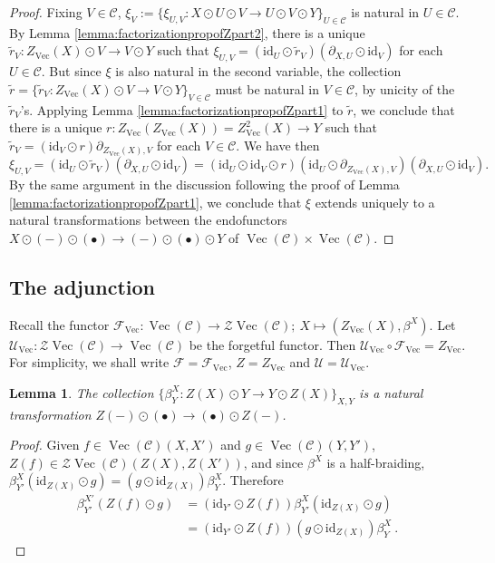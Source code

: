 \documentclass[a4paper,11pt,reqno]{amsart}
\numberwithin{equation}{section}
\newtheorem{lemma}[theorem]{Lemma}
\theoremstyle{remark}
\theoremstyle{definition}
\newcommand{\cC}{\mathcal C}
\newcommand{\cF}{\mathcal F}
\newcommand{\cU}{\mathcal U}
\newcommand{\cZ}{\mathcal Z}
\DeclareMathOperator{\Vect}{Vec}
\newcommand{\id}{\mathrm{id}}
\begin{document}
\begin{proof}
	Fixing $V \in \cC$, $\xi_V:= \{\xi_{U,V}: X \odot U \odot V \to U \odot V \odot Y\}_{U \in \cC}$ is natural in $U \in \cC$. By Lemma \ref{lemma:factorizationpropofZpart2}, there is a unique $\tilde{r}_V: Z_{\Vect}(X) \odot V \to V \odot Y$ such that $\xi_{U,V} = (\id_U \odot \tilde{r}_V)(\partial_{X,U} \odot \id_V)$ for each $U \in \cC$. But since $\xi$ is also natural in the second variable, the collection $\tilde{r} = \{ \tilde{r}_V: Z_{\Vect}(X) \odot V \to V \odot Y\}_{V \in \cC}$ must be natural in $V \in \cC$, by unicity of the $\tilde{r}_V$'s. Applying Lemma \ref{lemma:factorizationpropofZpart1} to $\tilde{r}$, we conclude that there is a unique $r: Z_{\Vect}(Z_{\Vect}(X)) = Z_{\Vect}^2(X) \to Y$ such that $\tilde{r}_V = (\id_V \odot r) \partial_{Z_{\Vect}(X),V}$ for each $V \in \cC$. We have then
	\[
	\xi_{U,V} = (\id_U \odot \tilde{r}_V)(\partial_{X,U} \odot \id_V) = (\id_U \odot \id_V \odot r)(\id_U \odot \partial_{Z_{\Vect}(X),V})(\partial_{X,U} \odot \id_V).
	\]
	By the same argument in the discussion following the proof of Lemma \ref{lemma:factorizationpropofZpart1}, we conclude that $\xi$ extends uniquely to a natural transformations between the endofunctors $X \odot (-) \odot(\bullet) \to (-) \odot (\bullet) \odot Y$ of $\Vect(\cC) \times \Vect(\cC)$.
\end{proof}


\subsection{The adjunction}
Recall the functor $\cF_{\Vect}: \Vect(\cC) \to \cZ \Vect(\cC);\ X \mapsto (Z_{\Vect}(X),\beta^X)$. Let $\cU_{\Vect}: \cZ \Vect(\cC) \to \Vect(\cC)$ be the forgetful functor. Then $\cU_{\Vect} \circ \cF_{\Vect} = Z_{\Vect}$. For simplicity, we shall write $\cF = \cF_{\Vect}$, $Z = Z_{\Vect}$ and $\cU = \cU_{\Vect}$.

\begin{lemma}
	The collection $\{\beta^X_Y: Z(X) \odot Y \to Y \odot Z(X)\}_{X,Y}$ is a natural transformation $Z(-) \odot (\bullet) \to (\bullet) \odot Z(-)$.
	\label{lemma:naturarilityfreehalfbraiding}
\end{lemma}
\begin{proof}
	Given $f \in \Vect(\cC)(X,X')$ and $g \in \Vect(\cC)(Y,Y')$, $Z(f) \in \cZ \Vect(\cC)(Z(X),Z(X'))$, and since $\beta^X$ is a half-braiding, $\beta^X_{Y'}(\id_{Z(X)} \odot g) = (g \odot \id_{Z(X)}) \beta^X_Y$. Therefore
	\begin{align*}
		\beta^{X'}_{Y'}(Z(f) \odot g) & = (\id_{Y'} \odot Z(f))\beta^X_{Y'}(\id_{Z(X)} \odot g) \\
		& = (\id_{Y'} \odot Z(f))(g \odot \id_{Z(X)})\beta^X_Y \ .
	\end{align*}
\end{proof}
\end{document}

